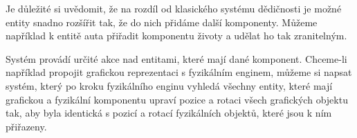 Je důležité si uvědomit, že na rozdíl od klasického systému dědičnosti je možné entity snadno rozšířit tak, že do nich přidáme další komponenty. Můžeme například k entitě auta přiřadit komponentu životy a udělat ho tak zranitelným.

Systém provádí určité akce nad entitami, které mají dané komponent. Chceme-li například propojit grafickou reprezentaci s fyzikálním enginem, můžeme si napsat systém, který po kroku fyzikálního enginu vyhledá všechny entity, které mají grafickou a fyzikální komponentu upraví pozice a rotaci všech grafických objektu tak, aby byla identická s pozicí a rotací fyzikálních objektů, které jsou k ním přiřazeny.